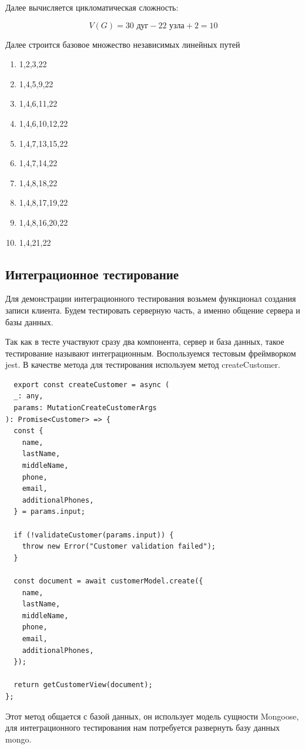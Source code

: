 \documentclass[a4paper,article,14pt]{extarticle}
\begin{document}
Далее вычисляется цикломатическая сложность:

$$ V(G) = 30 \text{ дуг} - 22 \text{ узла} + 2 = 10 $$

Далее строится базовое множество независимых линейных путей

\begin{enumerate}
    \item 1,2,3,22
    \item 1,4,5,9,22
    \item 1,4,6,11,22
    \item 1,4,6,10,12,22
    \item 1,4,7,13,15,22
    \item 1,4,7,14,22
    \item 1,4,8,18,22
    \item 1,4,8,17,19,22
    \item 1,4,8,16,20,22
    \item 1,4,21,22
\end{enumerate}


\subsection{Интеграционное тестирование}

Для демонстрации интеграционного тестирования возьмем функционал создания записи
клиента. Будем тестировать серверную часть, а именно общение сервера и базы данных.

Так как в тесте участвуют сразу два компонента, сервер и база данных, такое тестирование
называют интеграционным.
Воспользуемся тестовым фреймворком jest. В качестве метода для тестирования
используем метод createCustomer.

\begin{verbatim}
  export const createCustomer = async (
  _: any,
  params: MutationCreateCustomerArgs
): Promise<Customer> => {
  const {
    name,
    lastName,
    middleName,
    phone,
    email,
    additionalPhones,
  } = params.input;

  if (!validateCustomer(params.input)) {
    throw new Error("Customer validation failed");
  }

  const document = await customerModel.create({
    name,
    lastName,
    middleName,
    phone,
    email,
    additionalPhones,
  });

  return getCustomerView(document);
};
\end{verbatim}

Этот метод общается с базой данных, он использует модель сущности Mongoose,
для интеграционного тестирования нам потребуется развернуть базу данных mongo.
\end{document}
